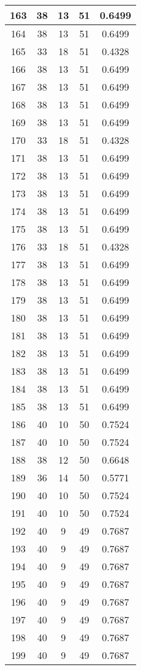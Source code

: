 \documentclass[letterpaper, 12pt]{article}
\begin{document}
\begin{longtable}{|c|c|c|c|c|}
\hline
163 & 38 & 13 & 51 & 0.6499 \\
\hline
164 & 38 & 13 & 51 & 0.6499 \\
\hline
165 & 33 & 18 & 51 & 0.4328 \\
\hline
166 & 38 & 13 & 51 & 0.6499 \\
\hline
167 & 38 & 13 & 51 & 0.6499 \\
\hline
168 & 38 & 13 & 51 & 0.6499 \\
\hline
169 & 38 & 13 & 51 & 0.6499 \\
\hline
170 & 33 & 18 & 51 & 0.4328 \\
\hline
171 & 38 & 13 & 51 & 0.6499 \\
\hline
172 & 38 & 13 & 51 & 0.6499 \\
\hline
173 & 38 & 13 & 51 & 0.6499 \\
\hline
174 & 38 & 13 & 51 & 0.6499 \\
\hline
175 & 38 & 13 & 51 & 0.6499 \\
\hline
176 & 33 & 18 & 51 & 0.4328 \\
\hline
177 & 38 & 13 & 51 & 0.6499 \\
\hline
178 & 38 & 13 & 51 & 0.6499 \\
\hline
179 & 38 & 13 & 51 & 0.6499 \\
\hline
180 & 38 & 13 & 51 & 0.6499 \\
\hline
181 & 38 & 13 & 51 & 0.6499 \\
\hline
182 & 38 & 13 & 51 & 0.6499 \\
\hline
183 & 38 & 13 & 51 & 0.6499 \\
\hline
184 & 38 & 13 & 51 & 0.6499 \\
\hline
185 & 38 & 13 & 51 & 0.6499 \\
\hline
186 & 40 & 10 & 50 & 0.7524 \\
\hline
187 & 40 & 10 & 50 & 0.7524 \\
\hline
188 & 38 & 12 & 50 & 0.6648 \\
\hline
189 & 36 & 14 & 50 & 0.5771 \\
\hline
190 & 40 & 10 & 50 & 0.7524 \\
\hline
191 & 40 & 10 & 50 & 0.7524 \\
\hline
192 & 40 & 9 & 49 & 0.7687 \\
\hline
193 & 40 & 9 & 49 & 0.7687 \\
\hline
194 & 40 & 9 & 49 & 0.7687 \\
\hline
195 & 40 & 9 & 49 & 0.7687 \\
\hline
196 & 40 & 9 & 49 & 0.7687 \\
\hline
197 & 40 & 9 & 49 & 0.7687 \\
\hline
198 & 40 & 9 & 49 & 0.7687 \\
\hline
199 & 40 & 9 & 49 & 0.7687 \\
\hline
\end{longtable}
\end{document}
